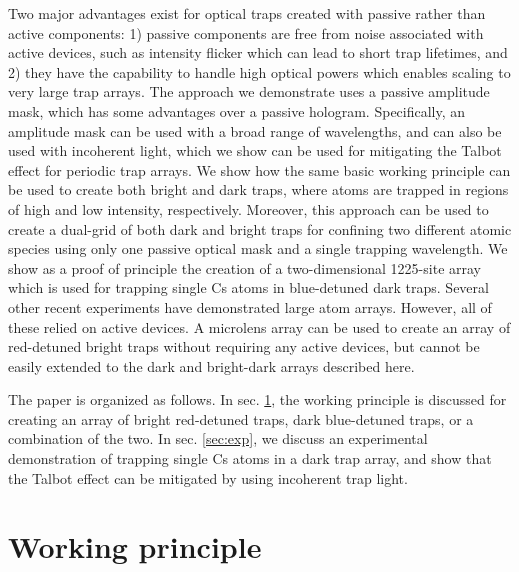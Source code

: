 Two major advantages exist for optical traps created with passive rather than active components: 1) passive components are free from noise associated with active devices, such as intensity flicker which can lead to short trap lifetimes\cite{Stuart2018}, and 2) they have the capability to handle high optical powers which enables scaling to very large trap arrays. The approach we demonstrate uses a passive amplitude mask, which has some advantages over a passive hologram. Specifically, an amplitude mask can be used with a broad range of wavelengths, and can also be used with incoherent light, which we show can be used for mitigating the Talbot effect for periodic trap arrays. We show how the same basic working principle can be used to create both bright and dark traps, where atoms are trapped in regions of high and low intensity, respectively. Moreover, this approach can be used to create a dual-grid of both dark and bright traps for confining two different atomic species\cite{Singh2022} using only one passive optical mask and a single trapping wavelength. We show as a proof of principle the creation of a two-dimensional 1225-site  array which is used for trapping single Cs atoms in blue-detuned dark traps. Several other recent experiments have demonstrated large atom arrays\cite{YWang2020,Scholl2021,Ebadi2021}. However, all of these relied on active devices. A microlens array can be used to create an array of red-detuned bright traps without requiring any active devices\cite{deMello2019}, but cannot be easily extended to the dark and bright-dark arrays described here.  

The paper is organized as follows. In sec. \ref{sec:theory}, the working principle is discussed for creating an array of bright red-detuned traps, dark blue-detuned traps, or a combination of the two. In sec. \ref{sec:exp}, we discuss an experimental demonstration of trapping single Cs atoms in a dark trap array, and show that the Talbot effect can be mitigated by using incoherent trap light. 

\section{Working principle} \label{sec:theory}

